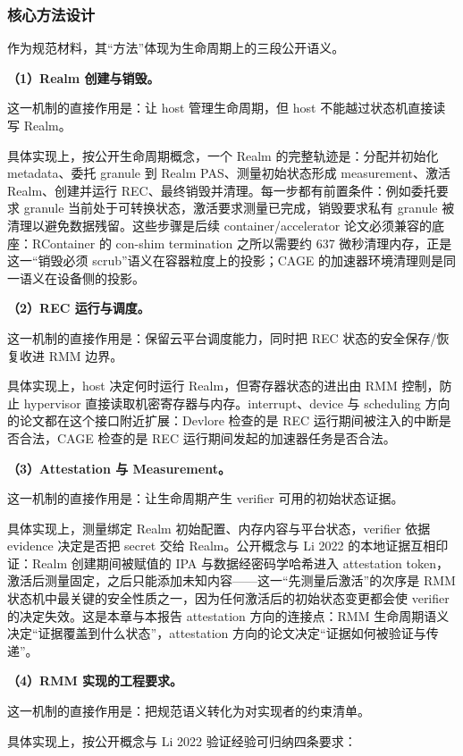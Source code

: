 \documentclass[11pt]{ctexart}
\begin{document}
\subsubsection{核心方法设计}
作为规范材料，其“方法”体现为生命周期上的三段公开语义。\par
\noindent\textbf{（1）Realm 创建与销毁。}\par
这一机制的直接作用是：让 host 管理生命周期，但 host 不能越过状态机直接读写 Realm。\par
具体实现上，按公开生命周期概念，一个 Realm 的完整轨迹是：分配并初始化 metadata、委托 granule 到 Realm PAS、测量初始状态形成 measurement、激活 Realm、创建并运行 REC、最终销毁并清理。每一步都有前置条件：例如委托要求 granule 当前处于可转换状态，激活要求测量已完成，销毁要求私有 granule 被清理以避免数据残留。这些步骤是后续 container/accelerator 论文必须兼容的底座：RContainer 的 con-shim termination 之所以需要约 637 微秒清理内存，正是这一“销毁必须 scrub”语义在容器粒度上的投影；CAGE 的加速器环境清理则是同一语义在设备侧的投影。\par
\noindent\textbf{（2）REC 运行与调度。}\par
这一机制的直接作用是：保留云平台调度能力，同时把 REC 状态的安全保存/恢复收进 RMM 边界。\par
具体实现上，host 决定何时运行 Realm，但寄存器状态的进出由 RMM 控制，防止 hypervisor 直接读取机密寄存器与内存。interrupt、device 与 scheduling 方向的论文都在这个接口附近扩展：Devlore 检查的是 REC 运行期间被注入的中断是否合法，CAGE 检查的是 REC 运行期间发起的加速器任务是否合法。\par
\noindent\textbf{（3）Attestation 与 Measurement。}\par
这一机制的直接作用是：让生命周期产生 verifier 可用的初始状态证据。\par
具体实现上，测量绑定 Realm 初始配置、内存内容与平台状态，verifier 依据 evidence 决定是否把 secret 交给 Realm。公开概念与 Li 2022 的本地证据互相印证：Realm 创建期间被赋值的 IPA 与数据经密码学哈希进入 attestation token，激活后测量固定，之后只能添加未知内容——这一“先测量后激活”的次序是 RMM 状态机中最关键的安全性质之一，因为任何激活后的初始状态变更都会使 verifier 的决定失效。这是本章与本报告 attestation 方向的连接点：RMM 生命周期语义决定“证据覆盖到什么状态”，attestation 方向的论文决定“证据如何被验证与传递”。\par
\noindent\textbf{（4）RMM 实现的工程要求。}\par
这一机制的直接作用是：把规范语义转化为对实现者的约束清单。\par
具体实现上，按公开概念与 Li 2022 验证经验可归纳四条要求：
\end{document}
